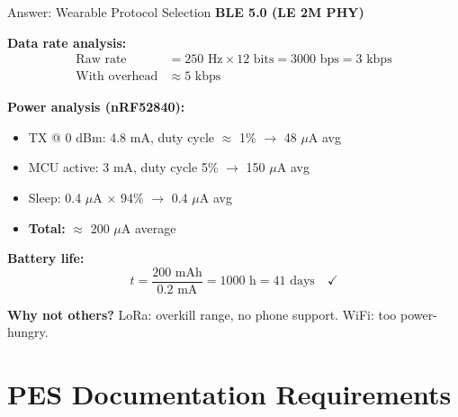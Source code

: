\documentclass[aspectratio=169,11pt]{beamer}
\begin{document}
\begin{frame}{Answer: Wearable Protocol Selection}
    \textbf{BLE 5.0 (LE 2M PHY)}
    
    \vspace{0.3cm}
    \textbf{Data rate analysis:}
    \begin{align*}
        \text{Raw rate} &= 250 \text{ Hz} \times 12 \text{ bits} = 3000 \text{ bps} = 3 \text{ kbps} \\
        \text{With overhead} &\approx 5 \text{ kbps}
    \end{align*}
    
    \textbf{Power analysis (nRF52840):}
    \begin{itemize}
        \item TX @ 0 dBm: 4.8 mA, duty cycle $\approx$ 1\% $\rightarrow$ 48 $\mu$A avg
        \item MCU active: 3 mA, duty cycle 5\% $\rightarrow$ 150 $\mu$A avg
        \item Sleep: 0.4 $\mu$A $\times$ 94\% $\rightarrow$ 0.4 $\mu$A avg
        \item \textbf{Total:} $\approx$ 200 $\mu$A average
    \end{itemize}
    
    \textbf{Battery life:}
    \[
    t = \frac{200 \text{ mAh}}{0.2 \text{ mA}} = 1000 \text{ h} = 41 \text{ days} \quad \checkmark
    \]
    
    \textbf{Why not others?} LoRa: overkill range, no phone support. WiFi: too power-hungry.
\end{frame}

\section{PES Documentation Requirements}
\end{document}

